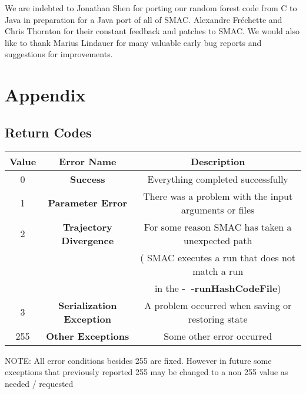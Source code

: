 \documentclass[11pt,letterpaper,oneside]{article}
\begin{document}
We are indebted to Jonathan Shen for porting our random forest code from C to Java in preparation for a Java port of all of SMAC. Alexandre Fr\'echette and Chris Thornton for their constant feedback and patches to SMAC.  We would also like to thank Marius Lindauer for many valuable early bug reports and suggestions for improvements. 



\renewcommand{\bibsection}{\section{References}}




\section{Appendix}
\subsection{Return Codes}

\begin{table}[h]
\begin{tabular}{| c | c | c |}
\hline
Value & Error Name & Description \\
\hline
\hline
0 & \textbf{Success} & Everything completed successfully \\
\hline
1 & \textbf{Parameter Error} & There was a problem with the input arguments or files  \\
\hline
2 & \textbf{Trajectory Divergence} & For some reason SMAC has taken a unexpected path \\

& & (\eg{} SMAC executes a run that does not match a run \\
& & in the \textbf{-~$\!\!$-runHashCodeFile}) \\
\hline
3 & \textbf{Serialization Exception} & A problem occurred when saving or restoring state \\
\hline
255 & \textbf{Other Exceptions} & Some other error occurred \\
\hline
\end{tabular}
\end{table}

\textsc{NOTE:} All error conditions besides 255 are fixed. However in future some exceptions that previously reported 255 may be changed to a non 255 value as needed / requested
\\
\\
\\
\\
\\
\\
\end{document}
